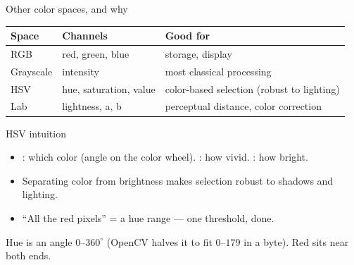 \documentclass[10pt,aspectratio=169]{beamer}
\begin{document}
\begin{frame}{Other color spaces, and why}
  \begin{center}
  \begin{tabular}{@{}lll@{}}
    \toprule
    \textbf{Space} & \textbf{Channels} & \textbf{Good for} \\
    \midrule
    RGB & red, green, blue & storage, display \\
    Grayscale & intensity & most classical processing \\
    HSV & hue, saturation, value & color-based selection (robust to lighting) \\
    Lab & lightness, a, b & perceptual distance, color correction \\
    \bottomrule
  \end{tabular}
  \end{center}
\end{frame}

\begin{frame}{HSV intuition}
  \begin{itemize}
    \item {}: which color (angle on the color wheel). : how vivid. : how bright.
    \item Separating color from brightness makes selection robust to shadows and lighting.
    \item ``All the red pixels'' = a hue range — one threshold, done.
  \end{itemize}
  \begin{infobox}
    Hue is an angle $0$--$360^\circ$ (OpenCV halves it to fit $0$--$179$ in a byte). Red sits near both ends.
  \end{infobox}
\end{frame}
\end{document}

